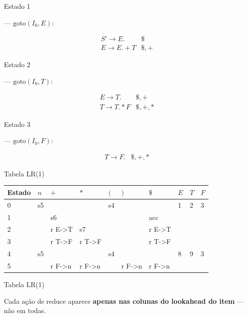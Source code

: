 \begin{frame}{Estado 1}

    --- \(\text{goto}(I_0, E)\):

    \[\begin{array}{ll}
    S' \to E . & \$ \\
    E \to E . + T & \$, +
\end{array}\]
\end{frame}

\begin{frame}{Estado 2}

    --- \(\text{goto}(I_0, T)\):

    \[\begin{array}{ll}
    E \to T . & \$, + \\
    T \to T . * F & \$, +, *
\end{array}\]
\end{frame}

\begin{frame}{Estado 3}

    --- \(\text{goto}(I_0, F)\):

    \[\begin{array}{ll}
    T \to F . & \$, +, *
\end{array}\]
\end{frame}

\begin{frame}{Tabela LR(1)}

    \begin{table}
        \begin{tabular}{l l l l}
            \hline
            Estado & \(n\) & \(+\) & \(*\) & \((\) & \()\) & \(\$\) & \(E\) & \(T\)
            & \(F\) \\
             & s5 & & & s4 & & & 1 & 2 & 3 \\
            1 & & s6 & & & & acc & & & \\
            2 & & r E->T & s7 & & & r E->T & & & \\
            3 & & r T->F & r T->F & & & r T->F & & & \\
            4 & s5 & & & s4 & & & 8 & 9 & 3 \\
            5 & & r F->n & r F->n & & r F->n & r F->n & & & \\
            \hline
        \end{tabular}
    \end{table}
\end{frame}

\begin{frame}{Tabela LR(1)}

    Cada ação de reduce aparece \textbf{apenas nas colunas do lookahead do
    item} --- não em todas.
\end{frame}


